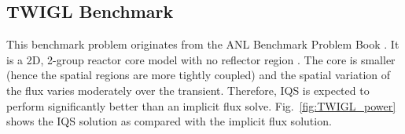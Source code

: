 \documentclass{elsarticle}
\newcommand{\fig}[1]{Fig.~\ref{#1}}                      %
\begin{document}
\subsection{TWIGL Benchmark}

This benchmark problem originates from the ANL Benchmark Problem Book \cite{ANL_BPB}.  It is a 2D, 2-group reactor core model with no reflector region \cite{TWIGL_benchmark}. The core is smaller (hence the spatial regions are more tightly coupled) and the spatial variation of the flux varies moderately over the transient. Therefore, IQS is expected to perform significantly better than an implicit flux solve. \fig{fig:TWIGL_power} shows the IQS  solution as compared with the implicit flux solution. 
\end{document}
